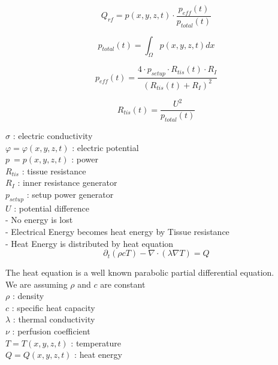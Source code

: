 \documentclass[parskip=half, titlepage=yes, 12pt, BCOR=12mm, DIV=calc]{scrartcl}
\begin{document}
\begin{equation}
    Q_{rf} = p(x,y,z,t) \cdot \frac{p_{eff}(t)}{p_{total}(t)} 
\end{equation}

\begin{equation}
    p_{total}(t) = \int_{\Omega} p(x,y,z,t) dx
\end{equation}

\begin{equation}
    p_{eff}(t) = \frac{4 \cdot p_{setup} \cdot R_{tis}(t) \cdot R_I}{(R_{tis}(t) + R_I)^2}
\end{equation}

\begin{equation}
    R_{tis}(t) = \frac{U^2}{p_{total}(t)}
\end{equation}

$\sigma$ : electric conductivity \\
$\varphi = \varphi(x,y,z,t)$ : electric potential \\
$p \: = p(x,y,z,t)$  : power \\


$R_{tis}$ : tissue resistance \\
$R_I$ : inner resistance generator \\
$p_{setup}$ : setup power generator \\
$U$ : potential difference\\


- No energy is lost \\
- Electrical Energy becomes heat energy by Tissue resistance \\
- Heat Energy is distributed by heat equation \\

\begin{equation}
    \partial_t (\rho c T) - \nabla \cdot (\lambda \nabla T) = Q
\end{equation}

The heat equation is a well known parabolic partial differential equation. \\

We are assuming $\rho$ and $c$ are constant \\
$\rho$ : density \\
$c$ : specific heat capacity \\
$\lambda$ : thermal conductivity \\ %
$\nu$ : perfusion coefficient \\
$T = T(x,y,z,t)$ : temperature \\
$Q = Q(x,y,z,t)$ : heat energy \\
\end{document}
